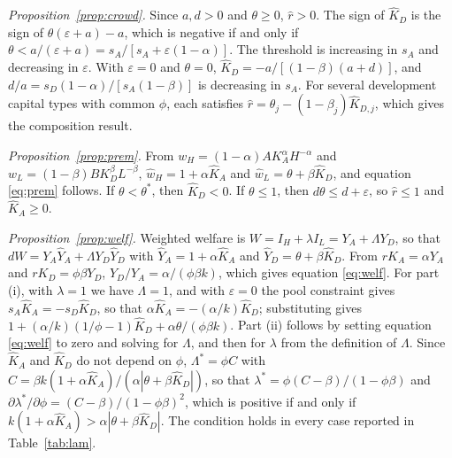 \documentclass[AER]{AEA}
\newcommand{\sA}{s_A}
\newcommand{\sD}{s_D}
\begin{document}
\textit{Proposition~\ref{prop:crowd}.} Since $a,d>0$ and $\theta\ge0$, $\hat{r}>0$. The sign of $\hat{K}_D$ is the sign of $\theta(\varepsilon+a)-a$, which is negative if and only if $\theta<a/(\varepsilon+a)=\sA/[\sA+\varepsilon(1-\alpha)]$. The threshold is increasing in $\sA$ and decreasing in $\varepsilon$. With $\varepsilon=0$ and $\theta=0$, $\hat{K}_D=-a/[(1-\beta)(a+d)]$, and $d/a=\sD(1-\alpha)/[\sA(1-\beta)]$ is decreasing in $\sA$. For several development capital types with common $\phi$, each satisfies $\hat{r}=\theta_j-(1-\beta_j)\hat{K}_{D,j}$, which gives the composition result.

\textit{Proposition~\ref{prop:prem}.} From $w_H=(1-\alpha)AK_A^{\alpha}H^{-\alpha}$ and $w_L=(1-\beta)BK_D^{\beta}L^{-\beta}$, $\hat{w}_H=1+\alpha\hat{K}_A$ and $\hat{w}_L=\theta+\beta\hat{K}_D$, and equation \eqref{eq:prem} follows. If $\theta<\theta^{*}$, then $\hat{K}_D<0$. If $\theta\le1$, then $d\theta\le d+\varepsilon$, so $\hat{r}\le1$ and $\hat{K}_A\ge0$.

\textit{Proposition~\ref{prop:welf}.} Weighted welfare is $W=I_H+\lambda I_L=Y_A+\Lambda Y_D$, so that $dW=Y_A\hat{Y}_A+\Lambda Y_D\hat{Y}_D$ with $\hat{Y}_A=1+\alpha\hat{K}_A$ and $\hat{Y}_D=\theta+\beta\hat{K}_D$. From $rK_A=\alpha Y_A$ and $rK_D=\phi\beta Y_D$, $Y_D/Y_A=\alpha/(\phi\beta k)$, which gives equation \eqref{eq:welf}. For part (i), with $\lambda=1$ we have $\Lambda=1$, and with $\varepsilon=0$ the pool constraint gives $\sA\hat{K}_A=-\sD\hat{K}_D$, so that $\alpha\hat{K}_A=-(\alpha/k)\hat{K}_D$; substituting gives $1+(\alpha/k)(1/\phi-1)\hat{K}_D+\alpha\theta/(\phi\beta k)$. Part (ii) follows by setting equation \eqref{eq:welf} to zero and solving for $\Lambda$, and then for $\lambda$ from the definition of $\Lambda$. Since $\hat{K}_A$ and $\hat{K}_D$ do not depend on $\phi$, $\Lambda^{*}=\phi C$ with $C=\beta k(1+\alpha\hat{K}_A)/(\alpha|\theta+\beta\hat{K}_D|)$, so that $\lambda^{*}=\phi(C-\beta)/(1-\phi\beta)$ and $\partial\lambda^{*}/\partial\phi=(C-\beta)/(1-\phi\beta)^{2}$, which is positive if and only if $k(1+\alpha\hat{K}_A)>\alpha|\theta+\beta\hat{K}_D|$. The condition holds in every case reported in Table~\ref{tab:lam}.
\end{document}
